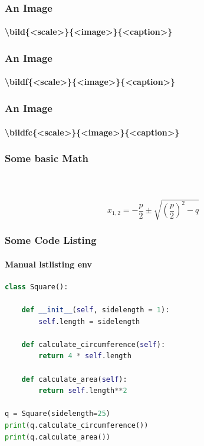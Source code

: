 \begin{frame}
\frametitle{An Image}
\framesubtitle{\textbackslash bild\{<scale>\}\{<image>\}\{<caption>\}}


\end{frame}


\begin{frame}
\frametitle{An Image}
\framesubtitle{\textbackslash bildf\{<scale>\}\{<image>\}\{<caption>\}}


\end{frame}


\begin{frame}
\frametitle{An Image}
\framesubtitle{\textbackslash bildfc\{<scale>\}\{<image>\}\{<caption>\}}


\end{frame}



\begin{frame}
\frametitle{Some basic Math}
\framesubtitle{~}

\begin{equation}
x_{1,2} = - \frac{p}{2} \pm 
\sqrt{ 
	\left( 
		\frac{p}{2} 
	\right)^2 
	- q}
\end{equation}

\end{frame}


\begin{frame}[fragile]
\frametitle{Some Code Listing}
\framesubtitle{Manual lstlisting env}

\begin{lstlisting}[language={Python}, caption={A square class in Python}, label={lis:square}]
class Square():

    def __init__(self, sidelength = 1):
        self.length = sidelength
        
    def calculate_circumference(self):
        return 4 * self.length
        
    def calculate_area(self):
        return self.length**2

q = Square(sidelength=25)
print(q.calculate_circumference())
print(q.calculate_area())
\end{lstlisting}

\end{frame}



